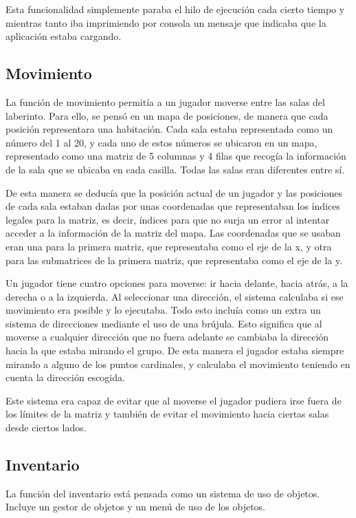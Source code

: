 Esta funcionalidad simplemente paraba el hilo de ejecución cada cierto tiempo y mientras tanto iba imprimiendo por consola un mensaje que indicaba que la aplicación estaba cargando.

\subsection{Movimiento}

La función de movimiento permitía a un jugador moverse entre las salas del laberinto. Para ello, se pensó en un mapa de posiciones, de manera que cada posición representara una habitación.
Cada sala estaba representada como un número del 1 al 20, y cada uno de estos números se ubicaron en un mapa, representado como una matriz de 5 columnas y 4 filas que recogía la información de la sala que se ubicaba en cada casilla. Todas las salas eran diferentes entre sí.

De esta manera se deducía que la posición actual de un jugador y las posiciones de cada sala estaban dadas por unas coordenadas que representaban los índices legales para la matriz, es decir, índices para que no surja un error al intentar acceder a la información de la matriz del mapa. Las coordenadas que se usaban eran una para la primera matriz, que representaba como el eje de la x, y otra para las submatrices de la primera matriz, que representaba como el eje de la y.

Un jugador tiene cuatro opciones para moverse: ir hacia delante, hacia atrás, a la derecha o a la izquierda. Al seleccionar una dirección, el sistema calculaba si ese movimiento era posible y lo ejecutaba.
Todo esto incluía como un extra un sistema de direcciones mediante el uso de una brújula. Esto significa que al moverse a cualquier dirección que no fuera adelante se cambiaba la dirección hacia la que estaba mirando el grupo. De esta manera el jugador estaba siempre mirando a alguno de los puntos cardinales, y calculaba el movimiento teniendo en cuenta la dirección escogida.

Este sistema era capaz de evitar que al moverse el jugador pudiera irse fuera de los límites de la matriz y también de evitar el movimiento hacia ciertas salas desde ciertos lados.

\subsection{Inventario}

La función del inventario está pensada como un sistema de uso de objetos. Incluye un gestor de objetos y un menú de uso de los objetos.

